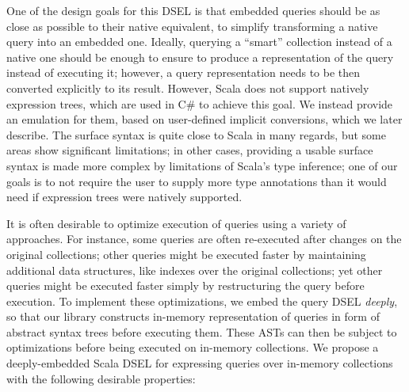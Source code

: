 \documentclass[preprint,authoryear,10pt]{sigplanconf}
\begin{document}
One of the design goals for this DSEL is that embedded queries should be
as close as possible to their native equivalent, to simplify
transforming a native query into an embedded one. Ideally, querying a
``smart'' collection instead of a native one should be enough to ensure
to produce a representation of the query instead of executing it;
however, a query representation needs to be then converted explicitly to
its result. However, Scala does not support natively expression trees,
which are used in C\# to achieve this goal. We instead provide an
emulation for them, based on user-defined implicit conversions, which we
later describe. The surface syntax is quite close to Scala in many
regards, but some areas show significant limitations; in other cases,
providing a usable surface syntax is made more complex by limitations of
Scala's type inference; one of our goals is to not require the user to
supply more type annotations than it would need if expression trees were
natively supported.


It is often desirable to optimize execution of queries using a variety
of approaches. For instance, some queries are often re-executed after
changes on the original collections; other queries might be executed
faster by maintaining additional data structures, like indexes over the
original collections; yet other queries might be executed faster simply
by restructuring the query before execution. To implement these
optimizations, we embed the query DSEL \emph{deeply}, so that our
library constructs in-memory representation of queries in form of
abstract syntax trees before executing them. These ASTs can then be
subject to optimizations before being executed on in-memory collections.
We propose a deeply-embedded Scala DSEL for expressing queries over
in-memory collections with the following desirable properties:
\end{document}
